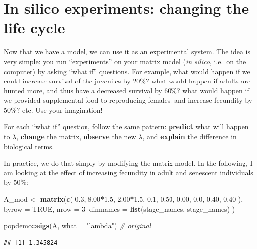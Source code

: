 \documentclass[
  a4paper]{book}
\newenvironment{Shaded}{\begin{snugshade}}{\end{snugshade}}
\newcommand{\AttributeTok}[1]{\textcolor[rgb]{0.13,0.29,0.53}{#1}}
\newcommand{\CommentTok}[1]{\textcolor[rgb]{0.56,0.35,0.01}{\textit{#1}}}
\newcommand{\ConstantTok}[1]{\textcolor[rgb]{0.56,0.35,0.01}{#1}}
\newcommand{\DecValTok}[1]{\textcolor[rgb]{0.00,0.00,0.81}{#1}}
\newcommand{\FloatTok}[1]{\textcolor[rgb]{0.00,0.00,0.81}{#1}}
\newcommand{\FunctionTok}[1]{\textcolor[rgb]{0.13,0.29,0.53}{\textbf{#1}}}
\newcommand{\NormalTok}[1]{#1}
\newcommand{\OtherTok}[1]{\textcolor[rgb]{0.56,0.35,0.01}{#1}}
\newcommand{\SpecialCharTok}[1]{\textcolor[rgb]{0.81,0.36,0.00}{\textbf{#1}}}
\newcommand{\StringTok}[1]{\textcolor[rgb]{0.31,0.60,0.02}{#1}}
\begin{document}
\section{In silico experiments: changing the life cycle}\label{in-silico-experiments-changing-the-life-cycle}

Now that we have a model, we can use it as an experimental system. The idea is very simple: you run ``experiments'' on your matrix model (\emph{in silico}, i.e.~on the computer) by asking ``what if'' questions. For example, what would happen if we could increase survival of the juveniles by 20\%? what would happen if adults are hunted more, and thus have a decreased survival by 60\%? what would happen if we provided supplemental food to reproducing females, and increase fecundity by 50\%? etc. Use your imagination!

For each ``what if'' question, follow the same pattern: \textbf{predict} what will happen to \(\lambda\), \textbf{change} the matrix, \textbf{observe} the new \(\lambda\), and \textbf{explain} the difference in biological terms.

In practice, we do that simply by modifying the matrix model. In the following, I am looking at the effect of increasing fecundity in adult and senescent individuals by 50\%:

\begin{Shaded}
\begin{Highlighting}[]
\NormalTok{A\_mod }\OtherTok{\textless{}{-}} \FunctionTok{matrix}\NormalTok{(}\FunctionTok{c}\NormalTok{(}
  \FloatTok{0.3}\NormalTok{, }\FloatTok{8.00}\SpecialCharTok{*}\FloatTok{1.5}\NormalTok{, }\FloatTok{2.00}\SpecialCharTok{*}\FloatTok{1.5}\NormalTok{,}
  \FloatTok{0.1}\NormalTok{, }\FloatTok{0.50}\NormalTok{, }\FloatTok{0.00}\NormalTok{,}
  \FloatTok{0.0}\NormalTok{, }\FloatTok{0.40}\NormalTok{, }\FloatTok{0.40}
\NormalTok{),}
\AttributeTok{byrow =} \ConstantTok{TRUE}\NormalTok{, }\AttributeTok{nrow =} \DecValTok{3}\NormalTok{,}
\AttributeTok{dimnames =} \FunctionTok{list}\NormalTok{(stage\_names, stage\_names)}
\NormalTok{)}

\NormalTok{popdemo}\SpecialCharTok{::}\FunctionTok{eigs}\NormalTok{(A, }\AttributeTok{what =} \StringTok{"lambda"}\NormalTok{)     }\CommentTok{\# original}
\end{Highlighting}
\end{Shaded}

\begin{verbatim}
## [1] 1.345824
\end{verbatim}
\end{document}
